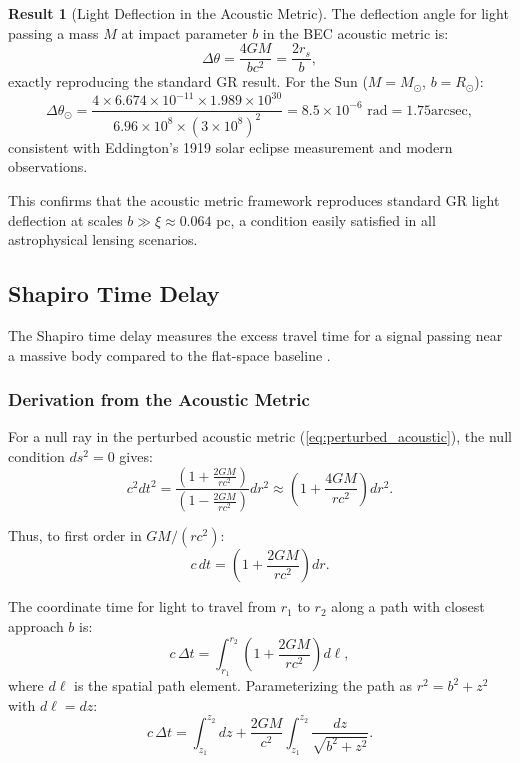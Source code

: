 \documentclass[11pt,a4paper]{article}
\newcommand{\ee}[1]{\times 10^{#1}}
\newcommand{\Msun}{\ensuremath{M_\odot}}
\newcommand{\arcsec}{\ensuremath{\text{arcsec}}}
\theoremstyle{definition}
\newtheorem{result}{Result}[section]
\theoremstyle{remark}
\begin{document}
\begin{result}[Light Deflection in the Acoustic Metric]
\label{res:deflection_angle}
The deflection angle for light passing a mass $M$ at impact parameter $b$ in the BEC acoustic metric is:
\begin{equation}
\boxed{\Delta\theta = \frac{4GM}{bc^2} = \frac{2r_s}{b},}
\end{equation}
exactly reproducing the standard GR result. For the Sun ($M = \Msun$, $b = R_\odot$):
\begin{equation}
\Delta\theta_\odot = \frac{4 \times 6.674 \ee{-11} \times 1.989 \ee{30}}{6.96 \ee{8} \times (3 \ee{8})^2} = 8.5 \ee{-6} \text{ rad} = 1.75\arcsec,
\end{equation}
consistent with Eddington's 1919 solar eclipse measurement and modern observations.
\end{result}

This confirms that the acoustic metric framework reproduces standard GR light deflection at scales $b \gg \xi \approx 0.064$ pc, a condition easily satisfied in all astrophysical lensing scenarios.

\subsection{Shapiro Time Delay}
\label{sec:shapiro_delay}

The Shapiro time delay measures the excess travel time for a signal passing near a massive body compared to the flat-space baseline \cite{Shapiro1964}.

\subsubsection{Derivation from the Acoustic Metric}

For a null ray in the perturbed acoustic metric (\ref{eq:perturbed_acoustic}), the null condition $ds^2 = 0$ gives:
\begin{equation}
c^2 dt^2 = \frac{\left(1 + \frac{2GM}{rc^2}\right)}{\left(1 - \frac{2GM}{rc^2}\right)} dr^2 \approx \left(1 + \frac{4GM}{rc^2}\right) dr^2.
\end{equation}

Thus, to first order in $GM/(rc^2)$:
\begin{equation}
c \, dt = \left(1 + \frac{2GM}{rc^2}\right) dr.
\end{equation}

The coordinate time for light to travel from $r_1$ to $r_2$ along a path with closest approach $b$ is:
\begin{equation}
c \, \Delta t = \int_{r_1}^{r_2} \left(1 + \frac{2GM}{rc^2}\right) d\ell,
\end{equation}
where $d\ell$ is the spatial path element. Parameterizing the path as $r^2 = b^2 + z^2$ with $d\ell = dz$:
\begin{equation}
c \, \Delta t = \int_{z_1}^{z_2} dz + \frac{2GM}{c^2} \int_{z_1}^{z_2} \frac{dz}{\sqrt{b^2 + z^2}}.
\end{equation}
\end{document}
